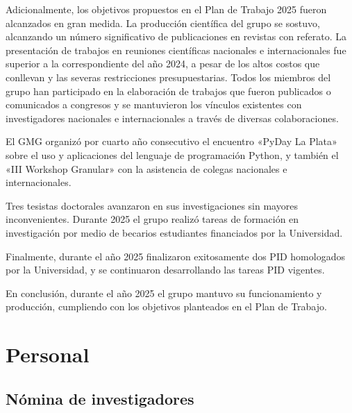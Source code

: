 \documentclass[a4paper,11pt,twoside,final,titlepage,onecolumn,openright]{report}
\begin{document}
Adicionalmente, los objetivos propuestos en el Plan de Trabajo 2025 fueron alcanzados en gran medida. La producción científica del grupo se sostuvo, alcanzando un número significativo de publicaciones en revistas con referato. La presentación de trabajos en reuniones científicas nacionales e internacionales fue superior a la correspondiente del año 2024, a pesar de los altos costos que conllevan y las severas restricciones presupuestarias. Todos los miembros del grupo han participado en la elaboración de trabajos que fueron publicados o comunicados a congresos y se mantuvieron los vínculos existentes con investigadores nacionales e internacionales a través de diversas colaboraciones.

El GMG organizó por cuarto año consecutivo el encuentro «PyDay La Plata» sobre el uso y aplicaciones del lenguaje de programación Python, y también el «III Workshop Granular» con la asistencia de colegas nacionales e internacionales.

Tres tesistas doctorales avanzaron en sus investigaciones sin mayores inconvenientes. Durante 2025 el grupo realizó tareas de formación en investigación por medio de becarios estudiantes financiados por la Universidad.

Finalmente, durante el año 2025 finalizaron exitosamente dos PID homologados por la Universidad, y se continuaron desarrollando las tareas PID vigentes.

En conclusión, durante el año 2025 el grupo mantuvo su funcionamiento y producción, cumpliendo con los objetivos planteados en el Plan de Trabajo.

\section{Personal}

\subsection{Nómina de investigadores}
\end{document}
